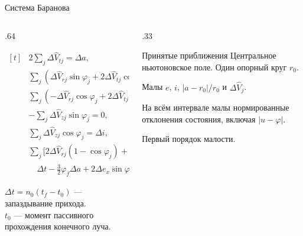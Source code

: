 \documentclass[11pt,aspectratio=169,t]{beamer}
\newcommand{\eqcompact}{\fontsize{10}{12}\selectfont}
\newcommand{\figcaption}[1]{{\usebeamerfont{caption}\color{coursemuted}#1\par}}
\newcommand{\derivationmathspacing}{%
  \setlength{\abovedisplayskip}{2pt}%
  \setlength{\belowdisplayskip}{3pt}%
  \setlength{\abovedisplayshortskip}{2pt}%
  \setlength{\belowdisplayshortskip}{2pt}%
  \setlength{\jot}{2pt}}
\begin{document}
\begin{frame}{Система Баранова}
\relax
\derivationmathspacing
\begin{columns}[T,onlytextwidth]
\begin{column}{.64\textwidth}
{\eqcompact\derivationmathspacing
\centering\(\displaystyle
\begin{aligned}[t]
 &2\sum\nolimits_j\Delta\widehat V_{tj}=\Delta a,\\
 &\sum\nolimits_j(\Delta\widehat V_{rj}\sin\varphi_j+
              2\Delta\widehat V_{tj}\cos\varphi_j)=\Delta e_x,\\
 &\sum\nolimits_j(-\Delta\widehat V_{rj}\cos\varphi_j+
              2\Delta\widehat V_{tj}\sin\varphi_j)=\Delta e_y,\\
 &-\sum\nolimits_j\Delta\widehat V_{zj}\sin\varphi_j=0,\\
 &\sum\nolimits_j\Delta\widehat V_{zj}\cos\varphi_j=\Delta i,\\
 &\sum\nolimits_j\bigl[2\Delta\widehat V_{rj}(1-\cos\varphi_j)
       +\Delta\widehat V_{tj}(-3\varphi_j+4\sin\varphi_j)\bigr]=\\[2pt]
 &\quad\Delta t-\frac32\varphi_f\Delta a
       +2\Delta e_x\sin\varphi_f+2\Delta e_y(1-\cos\varphi_f).
\end{aligned}
\)\par}
\smallskip
\figcaption{$\Delta t=n_0(t_f-t_0)$ --- запаздывание прихода.\\
$t_0$ --- момент пассивного прохождения конечного луча.}
\end{column}
\begin{column}{.33\textwidth}
\begin{block}{Принятые приближения}
Центральное ньютоновское поле. Один опорный круг $r_0$.\par\smallskip
Малы $e$, $i$, $|a-r_0|/r_0$ и $\Delta\widehat V_j$.\par\smallskip
На всём интервале малы нормированные отклонения состояния,
включая $|u-\varphi|$.\par\smallskip
Первый порядок малости.
\end{block}
\end{column}
\end{columns}
\end{frame}
\end{document}
